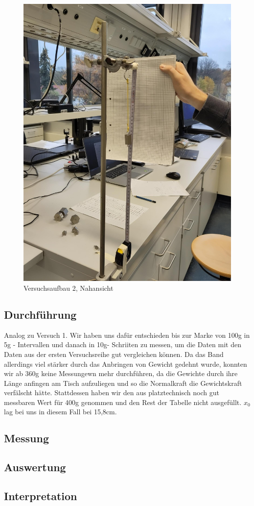 \documentclass[
  9pt,
]{article}
\begin{document}
\begin{figure}
\centering
\includegraphics{Bilder/V2B2.jpeg}
\caption{Versuchsaufbau 2, Nahansicht}
\end{figure}

\hypertarget{durchfuxfchrung-1}{%
\subsection{Durchführung}\label{durchfuxfchrung-1}}

Analog zu Versuch 1. Wir haben uns dafür entschieden bis zur Marke von
100g in 5g - Intervallen und danach in 10g- Schriiten zu messen, um die
Daten mit den Daten aus der ersten Versuchsreihe gut vergleichen können.
Da das Band allerdings viel stärker durch das Anbringen von Gewicht
gedehnt wurde, konnten wir ab 360g keine Messungewn mehr durchführen, da
die Gewichte durch ihre Länge anfingen am Tisch aufzuliegen und so die
Normalkraft die Gewichtskraft verfälscht hätte. Stattdessen haben wir
den aus platztechnisch noch gut messbaren Wert für 400g genommen und den
Rest der Tabelle nicht ausgefüllt. \(x_0\) lag bei uns in diesem Fall
bei 15,8cm.

\hypertarget{messung-1}{%
\subsection{Messung}\label{messung-1}}

\hypertarget{auswertung}{%
\subsection{Auswertung}\label{auswertung}}

\hypertarget{interpretation-1}{%
\subsection{Interpretation}\label{interpretation-1}}
\end{document}
